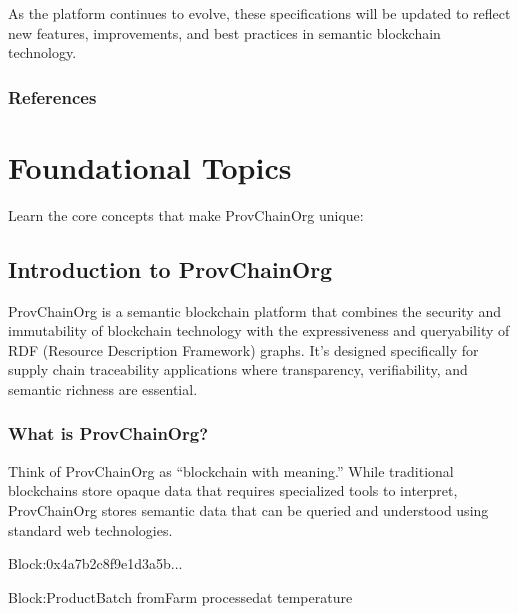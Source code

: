 \documentclass[letterpaper,10pt,english]{sphinxmanual}
\begin{document}
\sphinxAtStartPar
As the platform continues to evolve, these specifications will be updated to reflect new features, improvements, and best practices in semantic blockchain technology.


\subsubsection{References}
\label{\detokenize{research/technical-specifications:references}}



\section{Foundational Topics}
\label{\detokenize{index:foundational-topics}}
\sphinxAtStartPar
Learn the core concepts that make ProvChainOrg unique:

\sphinxstepscope


\subsection{Introduction to ProvChainOrg}
\label{\detokenize{foundational/intro-to-provchainorg:introduction-to-provchainorg}}\label{\detokenize{foundational/intro-to-provchainorg::doc}}
\sphinxAtStartPar
ProvChainOrg is a semantic blockchain platform that combines the security and immutability of blockchain technology with the expressiveness and queryability of RDF (Resource Description Framework) graphs. It’s designed specifically for supply chain traceability applications where transparency, verifiability, and semantic richness are essential.


\subsubsection{What is ProvChainOrg?}
\label{\detokenize{foundational/intro-to-provchainorg:what-is-provchainorg}}
\sphinxAtStartPar
Think of ProvChainOrg as “blockchain with meaning.” While traditional blockchains store opaque data that requires specialized tools to interpret, ProvChainOrg stores semantic data that can be queried and understood using standard web technologies.

\begin{sphinxVerbatim}[commandchars=\\\{\}]
Block:0x4a7b2c8f9e1d3a5b...

Block:ProductBatch
fromFarm
processedat
temperature
\end{sphinxVerbatim}
\end{document}
